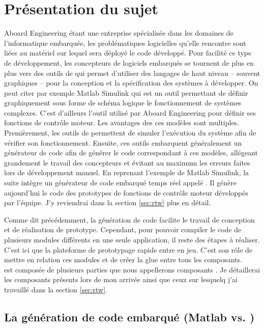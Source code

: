 \chapter{Présentation du sujet}
Aboard Engineering étant une entreprise spécialisée dans les domaines de
l'informatique embarquée, les problématiques logicielles qu'elle rencontre sont
liées au matériel sur lequel sera déployé le code développé. Pour facilité ce
type de développement, les concepteurs de logiciels embarqués se tournent de
plus en plus vers des outils de  qui permet d'utiliser des langages
de haut niveau -- souvent graphiques -- pour la conception et la spécification
des systèmes à développer. On peut citer par exemple Matlab\up{\circledR}
Simulink\up{\circledR} qui est un outil permettant de définir graphiquement sous
forme de schéma logique le fonctionnement de systèmes complexes. C'est
d'ailleurs l'outil utilisé par Aboard Engineering pour définir ses fonctions de
contrôle moteur. Les avantages des ces modèles sont multiples. Premièrement, les
outils de  permettent de simuler l'exécution du système afin de
vérifier son fonctionnement. Ensuite, ces outils embarquent généralement un
générateur de code afin de générer le code correspondant à ces modèles,
allégeant grandement le travail des concepteurs et évitant au maximum les
erreurs faites lors de développement \og manuel\fg{}. En reprenant l'exemple de
Matlab\up{\circledR} Simulink\up{\circledR}, la suite intègre un générateur de
code embarqué temps réel appelé . Il génère aujourd'hui le code des
prototypes de fonctions de contrôle moteur développés par l'équipe. J'y
reviendrai dans la section \ref{sec:rtw} plus en détail.

Comme dit précédemment, la génération de code facilite le travail de conception
et de réalisation de prototype. Cependant, pour pouvoir compiler le code de
plusieurs modules différents en une seule application, il reste des étapes à
réaliser. C'est ici que la plateforme de prototypage rapide 
entre en jeu. C'est son rôle de mettre en relation ces modules et de créer la
\og glue \fg{} entre tous les composants.\\
 est composée de plusieurs parties que nous appellerons \og
composants \fg{}. Je détaillerai les composants présents lors de mon arrivée
ainsi que ceux sur lesquelq j'ai travaillé dans la section \ref{sec:rtw}.

\section{La génération de code embarqué (Matlab\up{\circledR}  vs.
)}
